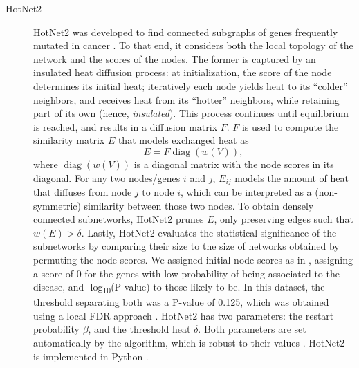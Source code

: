 \documentclass[twocolumn, 11pt]{article}
\begin{document}
\begin{description}
\item[{HotNet2}] HotNet2 was developed to find connected subgraphs of genes frequently mutated in cancer \cite{leiserson_pan-cancer_2015}. To that end, it considers both the local topology of the network and the scores of the nodes. The former is captured by an insulated heat diffusion process: at initialization, the score of the node determines its initial heat; iteratively each node yields heat to its ``colder'' neighbors, and receives heat from its ``hotter'' neighbors, while retaining part of its own (hence, \emph{insulated}). This process continues until equilibrium is reached, and results in a diffusion matrix $F$. $F$ is used to compute the similarity matrix $E$ that models exchanged heat as
\begin{equation*} 
E = F \operatorname{diag}(w(V)), 
\end{equation*}
where $\operatorname{diag}(w(V))$ is a diagonal matrix with the node scores in its diagonal. For any two nodes/genes $i$ and $j$, $E_{ij}$ models the amount of heat that diffuses from node $j$ to node $i$, which can be interpreted as a (non-symmetric) similarity between those two nodes. To obtain densely connected subnetworks, HotNet2 prunes $E$, only preserving edges such that $w(E) > \delta$. Lastly, HotNet2 evaluates the statistical significance of the subnetworks by comparing their size to the size of networks obtained by permuting the node scores. We assigned initial node scores as in \citet{nakka_gene_2016}, assigning a score of 0 for the genes with low probability of being associated to the disease, and -log\textsubscript{10}(P-value) to those likely to be. In this dataset, the threshold separating both was a P-value of 0.125, which was obtained using a local FDR approach \cite{scheid_twilight;_2005}. HotNet2 has two parameters: the restart probability \(\beta\), and the threshold heat \(\delta\). Both parameters are set automatically by the algorithm, which is robust to their values \cite{leiserson_pan-cancer_2015}. HotNet2 is implemented in Python \cite{hotnet2}.


\end{description}
\end{document}
